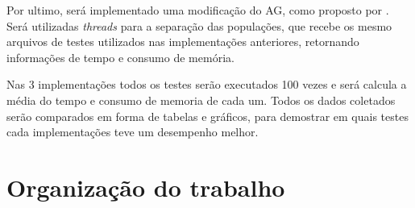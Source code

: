 Por ultimo, será implementado uma modificação do AG, como proposto por \cite{Alaoui}. Será utilizadas \textit{threads} para a separação das populações, que recebe os mesmo arquivos de testes utilizados nas implementações anteriores, retornando informações de tempo e consumo de memória.

Nas 3 implementações todos os testes serão executados 100 vezes e será calcula a média do tempo e consumo de memoria de cada um. Todos os dados coletados serão comparados em forma de tabelas e gráficos, para demostrar em quais testes cada implementações teve um desempenho melhor. 

\section{Organização do trabalho}


